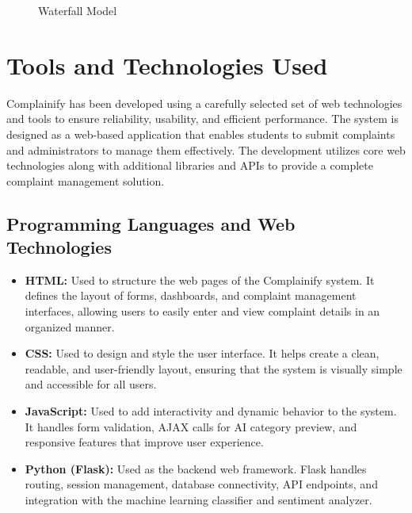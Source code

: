 \documentclass[12pt,a4paper]{report}
\begin{document}
\begin{figure}[H]
\centering
{}
\caption{Waterfall Model}
\end{figure}

\section{Tools and Technologies Used}
Complainify has been developed using a carefully selected set of web technologies and tools to ensure reliability, usability, and efficient performance. The system is designed as a web-based application that enables students to submit complaints and administrators to manage them effectively. The development utilizes core web technologies along with additional libraries and APIs to provide a complete complaint management solution.

\subsection{Programming Languages and Web Technologies}
\begin{itemize}[nolistsep]
    \item \textbf{HTML:} Used to structure the web pages of the Complainify system. It defines the layout of forms, dashboards, and complaint management interfaces, allowing users to easily enter and view complaint details in an organized manner.
    
    \item \textbf{CSS:} Used to design and style the user interface. It helps create a clean, readable, and user-friendly layout, ensuring that the system is visually simple and accessible for all users.
    
    \item \textbf{JavaScript:} Used to add interactivity and dynamic behavior to the system. It handles form validation, AJAX calls for AI category preview, and responsive features that improve user experience.
    
    \item \textbf{Python (Flask):} Used as the backend web framework. Flask handles routing, session management, database connectivity, API endpoints, and integration with the machine learning classifier and sentiment analyzer.
\end{itemize}
\end{document}
